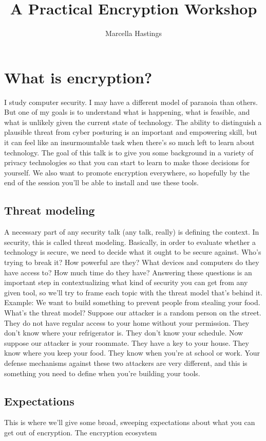 \documentclass{article}
\title{A Practical Encryption Workshop}
\author{Marcella Hastings}
\date{}
\begin{document}
\maketitle

\section{What is encryption?}
I study computer security. I may have a different model of paranoia than others. But one of my goals
is to understand what is happening, what is feasible, and what is unlikely given the current state
of technology. The ability to distinguish a plausible threat from cyber posturing is an important
and empowering skill, but it can feel like an insurmountable task when there’s so much left to
learn about technology. The goal of this talk is to give you some background in a variety of
privacy technologies so that you can start to learn to make those decisions for yourself. We
also want to promote encryption everywhere, so hopefully by the end of the session you’ll be able
to install and use these tools.
\subsection{Threat modeling}
A necessary part of any security talk (any talk, really) is defining the context. In security, this
is called threat modeling. Basically, in order to evaluate whether a technology is secure, we need
to decide what it ought to be secure against. Who’s trying to break it? How powerful are they? What
devices and computers do they have access to? How much time do they have? Answering these questions
is an important step in contextualizing what kind of security you can get from any given tool, so
we’ll try to frame each topic with the threat model that’s behind it. 
Example: We want to build something to prevent people from stealing your food. What’s the
threat model? Suppose our attacker is a random person on the street. They do not have regular
access to your home without your permission. They don’t know where your refrigerator is. They don’t
know your schedule. Now suppose our attacker is your roommate. They have a key to your house.
They know where you keep your food. They know when you’re at school or work. Your defense
mechanisms against these two attackers are very different, and this is something you need to define
when you’re building your tools.
\subsection{Expectations}
This is where we’ll give some broad, sweeping expectations about what you can get out of
encryption.
The encryption ecosystem 
\end{document}
